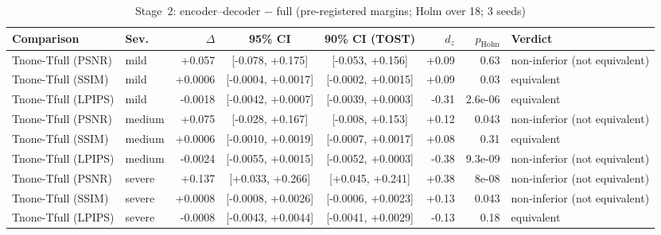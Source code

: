\begin{table}[t]
\centering
\caption{Stage~2: encoder--decoder $-$ full (pre-registered margins; Holm over 18; 3 seeds)}
\label{tab:translator_stats}
\scriptsize
\setlength{\tabcolsep}{3pt}
\begin{tabular}{llrccrrl}
\toprule
Comparison & Sev. & $\Delta$ & 95\% CI & 90\% CI (TOST) & $d_z$ & $p_\mathrm{Holm}$ & Verdict \\
\midrule
Tnone-Tfull (PSNR) & mild & +0.057 & [-0.078, +0.175] & [-0.053, +0.156] & +0.09 & 0.63 & non-inferior (not equivalent) \\
Tnone-Tfull (SSIM) & mild & +0.0006 & [-0.0004, +0.0017] & [-0.0002, +0.0015] & +0.09 & 0.03 & equivalent \\
Tnone-Tfull (LPIPS) & mild & -0.0018 & [-0.0042, +0.0007] & [-0.0039, +0.0003] & -0.31 & 2.6e-06 & equivalent \\
Tnone-Tfull (PSNR) & medium & +0.075 & [-0.028, +0.167] & [-0.008, +0.153] & +0.12 & 0.043 & non-inferior (not equivalent) \\
Tnone-Tfull (SSIM) & medium & +0.0006 & [-0.0010, +0.0019] & [-0.0007, +0.0017] & +0.08 & 0.31 & equivalent \\
Tnone-Tfull (LPIPS) & medium & -0.0024 & [-0.0055, +0.0015] & [-0.0052, +0.0003] & -0.38 & 9.3e-09 & non-inferior (not equivalent) \\
Tnone-Tfull (PSNR) & severe & +0.137 & [+0.033, +0.266] & [+0.045, +0.241] & +0.38 & 8e-08 & non-inferior (not equivalent) \\
Tnone-Tfull (SSIM) & severe & +0.0008 & [-0.0008, +0.0026] & [-0.0006, +0.0023] & +0.13 & 0.043 & non-inferior (not equivalent) \\
Tnone-Tfull (LPIPS) & severe & -0.0008 & [-0.0043, +0.0044] & [-0.0041, +0.0029] & -0.13 & 0.18 & equivalent \\
\bottomrule
\end{tabular}
\end{table}
